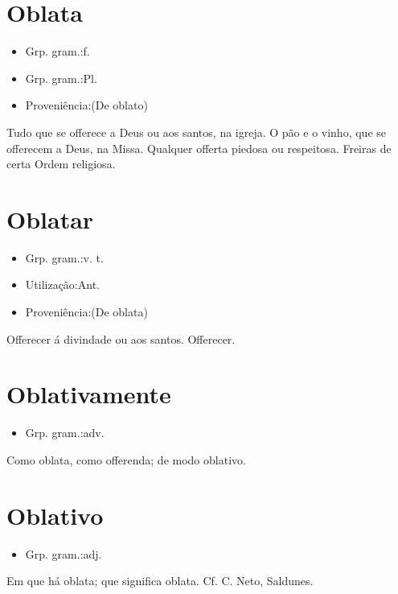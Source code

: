 \section{Oblata}
\begin{itemize}
\item {Grp. gram.:f.}
\end{itemize}
\begin{itemize}
\item {Grp. gram.:Pl.}
\end{itemize}
\begin{itemize}
\item {Proveniência:(De \textunderscore oblato\textunderscore )}
\end{itemize}
Tudo que se offerece a Deus ou aos santos, na igreja.
O pão e o vinho, que se offerecem a Deus, na Missa.
Qualquer offerta piedosa ou respeitosa.
Freiras de certa Ordem religiosa.
\section{Oblatar}
\begin{itemize}
\item {Grp. gram.:v. t.}
\end{itemize}
\begin{itemize}
\item {Utilização:Ant.}
\end{itemize}
\begin{itemize}
\item {Proveniência:(De \textunderscore oblata\textunderscore )}
\end{itemize}
Offerecer á divindade ou aos santos.
Offerecer.
\section{Oblativamente}
\begin{itemize}
\item {Grp. gram.:adv.}
\end{itemize}
Como oblata, como offerenda; de modo oblativo.
\section{Oblativo}
\begin{itemize}
\item {Grp. gram.:adj.}
\end{itemize}
Em que há oblata; que significa oblata. Cf. C. Neto, \textunderscore Saldunes\textunderscore .
